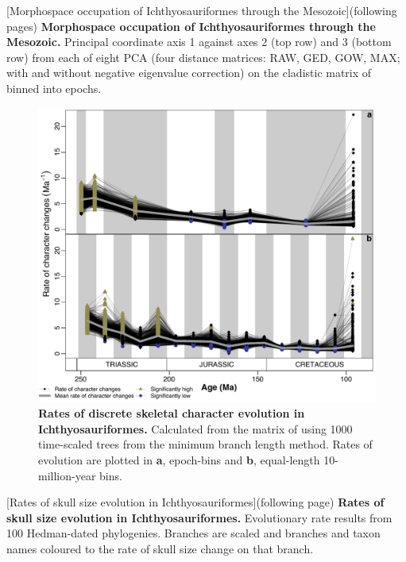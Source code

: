 \documentclass[british,a4paper]{article}
\begin{document}
\noindent\begin{minipage}[c]{\textwidth}
    [Morphospace occupation of Ichthyosauriformes through the
        Mesozoic]{(following pages) \textbf{Morphospace occupation of
        Ichthyosauriformes through the Mesozoic.} Principal coordinate axis 1
        against axes 2 (top row) and 3 (bottom row) from each of eight PCA (four
        distance matrices: RAW, GED, GOW, MAX\@; with and without negative eigenvalue
        correction) on the cladistic matrix of \textcite{Moon2018JSP} binned into
        epochs.\label{fig:morphospace-plots}}
\end{minipage}


\begin{figure}[h]
    \includegraphics[width = \textwidth, center]{supp_figures/figS8-rates_MBLspaghetti}
    \caption[Rates of discrete skeletal character evolution in
    Ichthyosauriformes]{\textbf{Rates of discrete skeletal character evolution in
    Ichthyosauriformes.} Calculated from the matrix of \textcite{Moon2018JSP} using
    1000 time-scaled trees from the minimum branch length method. Rates of evolution
    are plotted in \textbf{a}, epoch-bins and \textbf{b}, equal-length
    10-million-year bins.\label{fig:mbl-discrete-rates}}
\end{figure}

\noindent\begin{minipage}[c]{\textwidth}
    [Rates of skull size evolution in
        Ichthyosauriformes]{(following page) \textbf{Rates of skull size
        evolution in Ichthyosauriformes.} Evolutionary rate results from 100
        Hedman-dated phylogenies. Branches are scaled and branches and taxon
        names coloured to the rate of skull size change on that branch.} 
\end{minipage}

\end{document}
